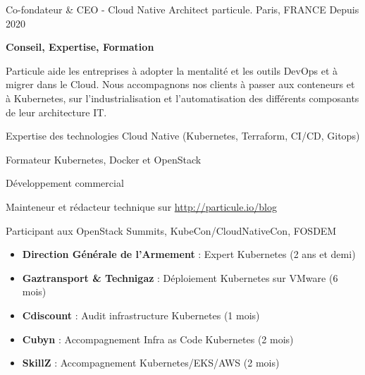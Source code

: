 

\begin{cventries}

\cventry
    {Co-fondateur \& CEO - Cloud Native Architect} %
    {particule.} %
    {Paris, FRANCE} %
    {Depuis 2020} %
    {
      \begin{cvitems} %
      \item {\textbf{Conseil, Expertise, Formation}}
      \item {Particule aide les entreprises à adopter la mentalité et les outils DevOps
        et à migrer dans le Cloud. Nous accompagnons nos clients à passer aux
          conteneurs et à Kubernetes, sur l'industrialisation et
          l'automatisation des différents composants de leur architecture IT.}
        \item {Expertise des technologies Cloud Native (Kubernetes, Terraform,
          CI/CD, Gitops)}
        \item {Formateur Kubernetes, Docker et OpenStack}
        \item {Développement commercial}
        \item {Mainteneur et rédacteur technique sur \url{http://particule.io/blog}}
        \item {Participant aux OpenStack Summits, KubeCon/CloudNativeCon, FOSDEM}
          \begin{itemize}
            \item{\textbf{Direction Générale de l'Armement} : Expert Kubernetes (2 ans et demi)}
            \item{\textbf{Gaztransport \& Technigaz} : Déploiement Kubernetes sur VMware (6 mois)}
            \item{\textbf{Cdiscount} : Audit infrastructure Kubernetes (1 mois)}
            \item{\textbf{Cubyn} : Accompagnement Infra as Code Kubernetes (2 mois)}
            \item{\textbf{SkillZ} : Accompagnement Kubernetes/EKS/AWS (2 mois)}
          \end{itemize}

\end{cvitems}}
\end{cventries}
